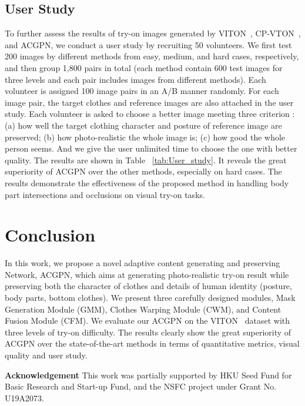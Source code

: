 \documentclass[10pt,twocolumn,letterpaper]{article}
\begin{document}
\subsection{User Study}
To further assess the results of try-on images generated by VITON~\cite{DBLP:conf/cvpr/HanWWYD18}, CP-VTON~\cite{DBLP:conf/eccv/WangZLCLY18}, and ACGPN, we conduct a user study by recruiting 50 volunteers. We first test 200 images by different methods from easy, medium, and hard cases, respectively, and then group 1,800 pairs in total (each method contain 600 test images for three levels and each pair includes images from different methods).
Each volunteer is assigned 100 image pairs in an A/B manner randomly.
For each image pair, the target clothes and reference images are also attached in the user study. Each volunteer is asked to choose a better image meeting three criterion : (a) how well the target clothing character and posture of reference image are preserved; (b) how photo-realistic the whole image is; (c) how good the whole person seems. And we give the user unlimited time to choose the one with better quality. The results are shown in Table ~\ref{tab:User_study}. It reveals the great superiority of ACGPN over the other methods, especially on hard cases. The results demonstrate the effectiveness of the proposed method in handling body part intersections and occlusions on visual try-on tasks.





\section{Conclusion}
In this work, we propose a novel adaptive content generating and preserving Network, \ie ACGPN, which aims at generating photo-realistic try-on result while preserving both the character of clothes and details of human identity (posture, body parts, bottom clothes).
We present three carefully designed modules, \ie Mask Generation Module (GMM), Clothes Warping Module (CWM), and Content Fusion Module (CFM).
We evaluate our ACGPN on the VITON~\cite{DBLP:conf/cvpr/HanWWYD18} dataset with three levels of try-on difficulty.
The results clearly show the great superiority of ACGPN over the state-of-the-art methods in terms of quantitative metrics, visual quality and user study.

\small{
\textbf{Acknowledgement}
This work was partially supported by HKU Seed Fund for Basic Research and Start-up Fund, and the NSFC project under Grant No. U19A2073. }
\end{document}
